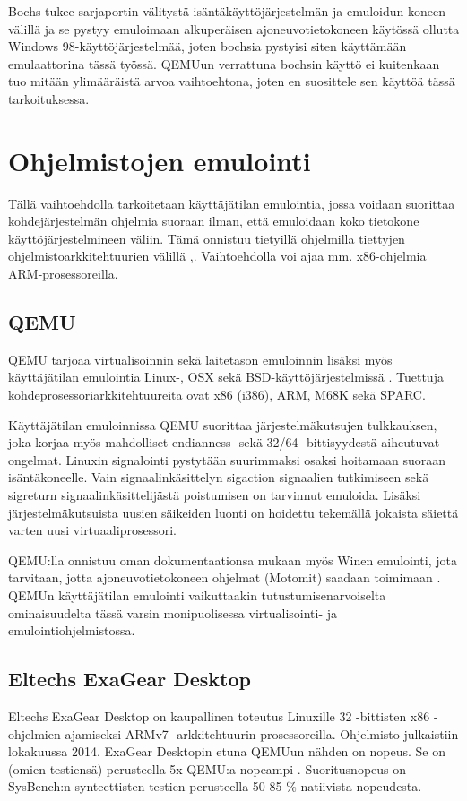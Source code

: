 Bochs tukee sarjaportin välitystä isäntäkäyttöjärjestelmän ja emuloidun koneen välillä ja se pystyy emuloimaan alkuperäisen ajoneuvotietokoneen käytössä ollutta Windows 98-käyttöjärjestelmää, joten bochsia pystyisi siten käyttämään emulaattorina tässä työssä. QEMUun verrattuna bochsin käyttö ei kuitenkaan tuo mitään ylimääräistä arvoa vaihtoehtona, joten en suosittele sen käyttöä tässä tarkoituksessa.


\section{Ohjelmistojen emulointi}

Tällä vaihtoehdolla tarkoitetaan käyttäjätilan emulointia, jossa voidaan suorittaa kohdejärjestelmän ohjelmia suoraan ilman, että emuloidaan koko tietokone käyttöjärjestelmineen väliin. Tämä onnistuu tietyillä ohjelmilla tiettyjen ohjelmistoarkkitehtuurien välillä \cite{tinycc},\cite{qemu_use}. Vaihtoehdolla voi ajaa mm. x86-ohjelmia ARM-prosessoreilla.

\subsection{QEMU}
QEMU tarjoaa virtualisoinnin sekä laitetason emuloinnin lisäksi myös käyttäjätilan emulointia Linux-, OSX sekä BSD-käyttöjärjestelmissä \cite{qemu_use}. Tuettuja kohdeprosessoriarkkitehtuureita ovat x86 (i386), ARM, M68K sekä SPARC.

Käyttäjätilan emuloinnissa QEMU suorittaa järjestelmäkutsujen tulkkauksen, joka korjaa myös mahdolliset endianness- sekä 32/64 -bittisyydestä aiheutuvat ongelmat. Linuxin signalointi pystytään suurimmaksi osaksi hoitamaan suoraan isäntäkoneelle. Vain signaalinkäsittelyn sigaction signaalien tutkimiseen sekä sigreturn signaalinkäsittelijästä poistumisen on tarvinnut emuloida. Lisäksi järjestelmäkutsuista uusien säikeiden luonti on hoidettu tekemällä jokaista säiettä varten uusi virtuaaliprosessori. \cite{qemu_tech}

QEMU:lla onnistuu oman dokumentaationsa mukaan myös Winen emulointi, jota tarvitaan, jotta ajoneuvotietokoneen ohjelmat (Motomit) saadaan toimimaan \cite{qemu_use}. QEMUn käyttäjätilan emulointi vaikuttaakin tutustumisenarvoiselta ominaisuudelta tässä varsin monipuolisessa virtualisointi- ja emulointiohjelmistossa.


\subsection{Eltechs ExaGear Desktop}
Eltechs ExaGear Desktop on kaupallinen toteutus Linuxille 32 -bittisten x86 -ohjelmien ajamiseksi ARMv7 -arkkitehtuurin prosessoreilla. Ohjelmisto julkaistiin lokakuussa 2014. ExaGear Desktopin etuna QEMUun nähden on nopeus. Se on (omien testiensä) perusteella 5x QEMU:a nopeampi \cite{eltechs:exagear}. Suoritusnopeus on SysBench:n synteettisten testien perusteella 50-85 \% natiivista nopeudesta.


